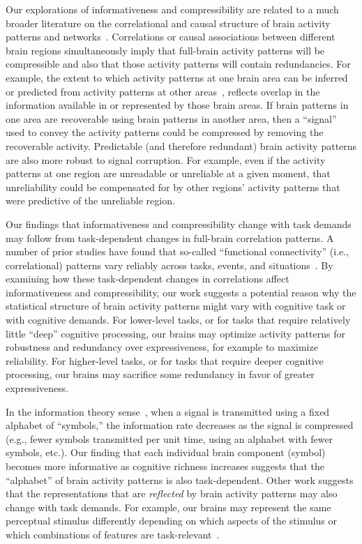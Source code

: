 \documentclass[english, 11pt]{article}
\begin{document}
Our explorations of informativeness and compressibility are related to a much
broader literature on the correlational and causal structure of brain activity
patterns and networks~\citep{PretEtal17, OwenEtal21, RogeEtal07, RubiSpor10,
SizeEtal18, SmitEtal13b, SmitEtal13c, SrinEtal07, TomaVolk11, YeoEtal11,
AdacEtal12, BassSpor17, BullSpor09, SporHone06, SporBetz16, SporZwi04,
DhamEtal08, KorzEtal08, BrovEtal04, LynnBass21}. Correlations or causal
associations between different brain regions simultaneously imply that
full-brain activity patterns will be compressible and also that those activity
patterns will contain redundancies. For example, the extent to which activity
patterns at one brain area can be inferred or predicted from activity patterns
at other areas~\citep[e.g.,][]{OwenEtal20, ScanEtal21}, reflects overlap in the
information available in or represented by those brain areas. If brain patterns
in one area are recoverable using brain patterns in another area, then a
``signal'' used to convey the activity patterns could be compressed by removing
the recoverable activity. Predictable (and therefore redundant) brain activity
patterns are also more robust to signal corruption. For example, even if the
activity patterns at one region are unreadable or unreliable at a given moment,
that unreliability could be compensated for by other regions' activity patterns
that were predictive of the unreliable region.

Our findings that informativeness and compressibility change with task demands
may follow from task-dependent changes in full-brain correlation patterns. A
number of prior studies have found that so-called ``functional connectivity''
(i.e., correlational) patterns vary reliably across tasks, events, and
situations~\citep{SimoEtal16, ColeEtal14, SmitEtal09, OwenEtal21}. By examining
how these task-dependent changes in correlations affect informativeness and
compressibility, our work suggests a potential reason why the statistical
structure of brain activity patterns might vary with cognitive task or with
cognitive demands. For lower-level tasks, or for tasks that require relatively
little ``deep'' cognitive processing, our brains may optimize activity patterns
for robustness and redundancy over expressiveness, for example to maximize
reliability. For higher-level tasks, or for tasks that require deeper cognitive
processing, our brains may sacrifice some redundancy in favor of greater
expressiveness.

In the information theory sense~\citep{Shan48}, when a signal is transmitted
using a fixed alphabet of ``symbols,'' the information rate decreases as the
signal is compressed (e.g., fewer symbols transmitted per unit time, using an
alphabet with fewer symbols, etc.). Our finding that each individual brain
component (symbol) becomes more informative as cognitive richness increases
suggests that the ``alphabet'' of brain activity patterns is also
task-dependent. Other work suggests that the representations that are
\textit{reflected} by brain activity patterns may also change with task
demands. For example, our brains may represent the same perceptual stimulus
differently depending on which aspects of the stimulus or which combinations of
features are task-relevant~\citep{MackEtal20}.
\end{document}
